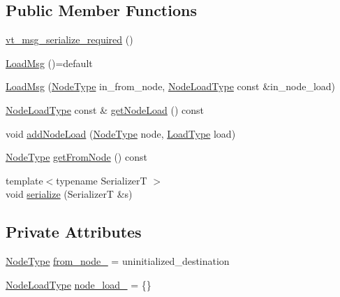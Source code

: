\subsection*{Public Member Functions}
\begin{DoxyCompactItemize}
\item 
\hyperlink{structvt_1_1vrt_1_1collection_1_1balance_1_1_load_msg_a7af4e3144817b0517e51d9822d8fffbb}{vt\+\_\+msg\+\_\+serialize\+\_\+required} ()
\item 
\hyperlink{structvt_1_1vrt_1_1collection_1_1balance_1_1_load_msg_a1b1079cba829ea2b6550b23ca0291c6f}{Load\+Msg} ()=default
\item 
\hyperlink{structvt_1_1vrt_1_1collection_1_1balance_1_1_load_msg_a8efcccdd438315320ef290e81d0e6884}{Load\+Msg} (\hyperlink{namespacevt_a866da9d0efc19c0a1ce79e9e492f47e2}{Node\+Type} in\+\_\+from\+\_\+node, \hyperlink{structvt_1_1vrt_1_1collection_1_1balance_1_1_load_msg_a573cc4f6cf58c3160e94a6351a3912d2}{Node\+Load\+Type} const \&in\+\_\+node\+\_\+load)
\item 
\hyperlink{structvt_1_1vrt_1_1collection_1_1balance_1_1_load_msg_a573cc4f6cf58c3160e94a6351a3912d2}{Node\+Load\+Type} const  \& \hyperlink{structvt_1_1vrt_1_1collection_1_1balance_1_1_load_msg_a736ae1674935e332f1e9827f8496707c}{get\+Node\+Load} () const
\item 
void \hyperlink{structvt_1_1vrt_1_1collection_1_1balance_1_1_load_msg_a6d747c16d4f2382d132971c9fab36dca}{add\+Node\+Load} (\hyperlink{namespacevt_a866da9d0efc19c0a1ce79e9e492f47e2}{Node\+Type} node, \hyperlink{namespacevt_a8fb51741340b87d7aaee0bef60e9896b}{Load\+Type} load)
\item 
\hyperlink{namespacevt_a866da9d0efc19c0a1ce79e9e492f47e2}{Node\+Type} \hyperlink{structvt_1_1vrt_1_1collection_1_1balance_1_1_load_msg_ab9a7c49ba4e6f57db8f2f912f1f3e024}{get\+From\+Node} () const
\item 
{\footnotesize template$<$typename SerializerT $>$ }\\void \hyperlink{structvt_1_1vrt_1_1collection_1_1balance_1_1_load_msg_a41cb0f33effbb6fa7c9306367ef45de9}{serialize} (SerializerT \&s)
\end{DoxyCompactItemize}
\subsection*{Private Attributes}
\begin{DoxyCompactItemize}
\item 
\hyperlink{namespacevt_a866da9d0efc19c0a1ce79e9e492f47e2}{Node\+Type} \hyperlink{structvt_1_1vrt_1_1collection_1_1balance_1_1_load_msg_a0f4e4ee3be0ec523e6bebe15ddcd3459}{from\+\_\+node\+\_\+} = uninitialized\+\_\+destination
\item 
\hyperlink{structvt_1_1vrt_1_1collection_1_1balance_1_1_load_msg_a573cc4f6cf58c3160e94a6351a3912d2}{Node\+Load\+Type} \hyperlink{structvt_1_1vrt_1_1collection_1_1balance_1_1_load_msg_afdbf7d2d139d40c8e04958d2c02bb94d}{node\+\_\+load\+\_\+} = \{\}
\end{DoxyCompactItemize}
